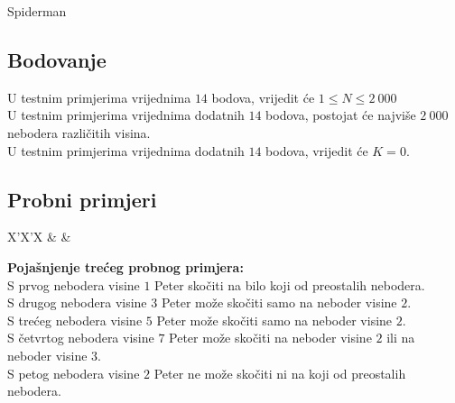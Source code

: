 \begin{statement}[
  problempoints=70,
  timelimit=2 sekunde,
  memorylimit=512 MiB,
]{Spiderman}
\subsection*{Bodovanje}
U testnim primjerima vrijednima $14$ bodova, vrijedit će $1 \le N \le 2\ 000$\\
U testnim primjerima vrijednima dodatnih $14$ bodova, postojat će najviše $2\ 000$
nebodera različitih visina.\\
U testnim primjerima vrijednima dodatnih $14$ bodova, vrijedit će $K = 0$.

\subsection*{Probni primjeri}
\begin{tabularx}{\textwidth}{X'X'X}
 &
 &
\end{tabularx}

\textbf{Pojašnjenje trećeg probnog primjera:}\\
S prvog nebodera visine $1$ Peter skočiti na bilo koji od preostalih nebodera.\\
S drugog nebodera visine $3$ Peter može skočiti samo na neboder visine $2$.\\
S trećeg nebodera visine $5$ Peter može skočiti samo na neboder visine $2$.\\
S četvrtog nebodera visine $7$ Peter može skočiti na neboder visine $2$ ili na neboder visine $3$.\\
S petog nebodera visine $2$ Peter ne može skočiti ni na koji od preostalih nebodera.

\end{statement}

